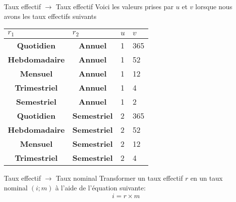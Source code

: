\documentclass[11pt]{beamer}
\begin{document}
\begin{frame}{Taux effectif $\rightarrow$ Taux effectif}
Voici les valeurs prises par $u$ et $v$ lorsque nous avons les taux effectifs suivants 


\begin{table}[H]
\begin{center}
\begin{tabular}{|c|c|l|l|}
\hline
\multicolumn{1}{|l|}{\textbf{$r_1$}} & \multicolumn{1}{l|}{\textbf{$r_2$}} & \textbf{$u$} & \textbf{$v$} \\ \hline
\textbf{Quotidien}                   & \textbf{Annuel}                     & 1            & 365          \\ \hline
\textbf{Hebdomadaire}                & \textbf{Annuel}                     & 1            & 52           \\ \hline
\textbf{Mensuel}                     & \textbf{Annuel}                     & 1            & 12           \\ \hline
\textbf{Trimestriel}                 & \textbf{Annuel}                     & 1            & 4            \\ \hline
\textbf{Semestriel}                  & \textbf{Annuel}                     & 1            & 2            \\ \hline
\textbf{Quotidien}                   & \textbf{Semestriel}                 & 2            & 365          \\ \hline
\textbf{Hebdomadaire}                & \textbf{Semestriel}                 & 2            & 52           \\ \hline
\textbf{Mensuel}                     & \textbf{Semestriel}                 & 2            & 12           \\ \hline
\textbf{Trimestriel}                 & \textbf{Semestriel}                 & 2            & 4            \\ \hline
\end{tabular}
\end{center}
\end{table}
\end{frame}

\begin{frame}{Taux effectif $\rightarrow$ Taux nominal}
Transformer un taux effectif $r$ en un taux nominal $(i;m)$ à l'aide de l'équation suivante:
\begin{align*}
i = r \times m
\end{align*}
\end{frame}
\end{document}
